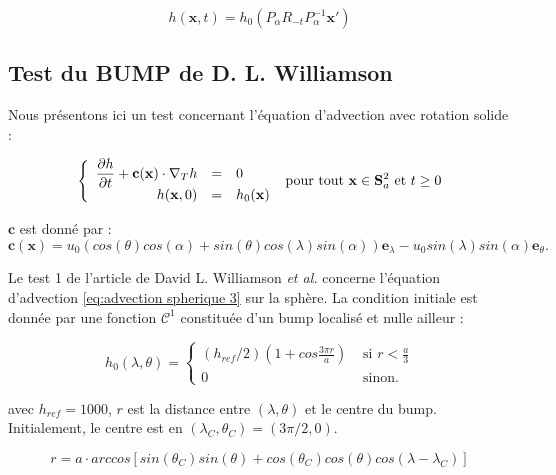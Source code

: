 \begin{equation}
\label{eq: advection solution 2}
h( \mathbf{x}, t ) = h_0(  P_{\alpha} R_{-t} P_{\alpha}^{-1} \mathbf{x}')
\end{equation}


\subsection{Test du BUMP de D. L. Williamson}

Nous présentons ici un test concernant l'équation d'advection avec rotation solide :

\begin{equation}
\label{eq:advection spherique 3}
\left\lbrace
\begin{array}{r cl}
\dfrac{\partial h}{\partial t} + \mathbf{c} ( \mathbf{x} ) \cdot \nabla_ T h & = & 0 \\
h(\mathbf{x},0) & = & h_0 ( \mathbf{x} )
\end{array}
\right. \text{ pour tout } \mathbf{x} \in \mathbf{S}_a^2 \text{ et } t \geq 0
\end{equation}

$\mathbf{c}$ est donné par :
$$\mathbf{c} ( \mathbf{x} ) = u_0 ( cos ( \theta) cos ( \alpha ) + sin( \theta) cos ( \lambda) sin( \alpha) ) \mathbf{e}_{\lambda} - u_0 sin( \lambda) sin( \alpha) \mathbf{e}_{\theta}. $$

Le test 1 de l'article de David L. Williamson \textit{et al.} \cite{Williamson1992} concerne l'équation d'advection \eqref{eq:advection spherique 3} sur la sphère. La condition initiale est donnée par une fonction $\mathcal{C}^1$ constituée d'un bump localisé et nulle ailleur :

\begin{equation}
h_0(\lambda, \theta) = 
\left\lbrace
\begin{array}{ll}
(h_{ref}/2) \left( 1+cos \frac{3 \pi r}{a} \right) & \text{ si } r<\frac{a}{3} \\
0 & \text{ sinon.}
\end{array}
\right.
\end{equation}

avec $h_{ref}=1000$, $r$ est la distance entre $(\lambda, \theta)$ et le centre du bump. Initialement, le centre est en $(\lambda_C, \theta_C) = (3 \pi /2, 0)$.

\begin{equation}
r = a \cdot arccos \left[ sin ( \theta_C) sin( \theta) + cos( \theta_C) cos ( \theta) cos ( \lambda - \lambda_C ) \right]
\end{equation}

